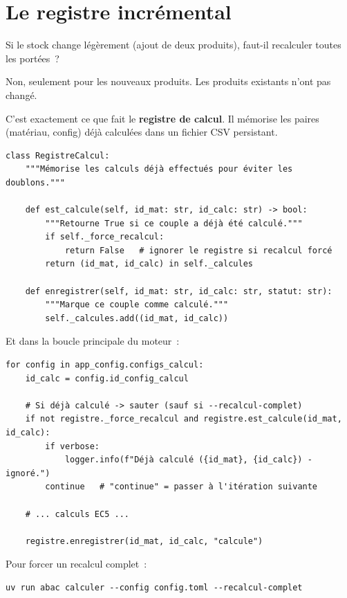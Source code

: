 \section{Le registre incr\'emental}

\begin{maitre}
Si le stock change l\'eg\`erement (ajout de deux produits),
faut-il recalculer toutes les port\'ees~?
\end{maitre}

\begin{apprenti}
Non, seulement pour les nouveaux produits.
Les produits existants n'ont pas chang\'e.
\end{apprenti}

\begin{maitre}
C'est exactement ce que fait le \textbf{registre de calcul}.
Il m\'emorise les paires (mat\'eriau, config) d\'ej\`a calcul\'ees
dans un fichier CSV persistant.
\end{maitre}

\begin{lstlisting}[style=python, caption={Registre incrémental --- extrait de \fichier{registre.py}}]
class RegistreCalcul:
    """Mémorise les calculs déjà effectués pour éviter les doublons."""

    def est_calcule(self, id_mat: str, id_calc: str) -> bool:
        """Retourne True si ce couple a déjà été calculé."""
        if self._force_recalcul:
            return False   # ignorer le registre si recalcul forcé
        return (id_mat, id_calc) in self._calcules

    def enregistrer(self, id_mat: str, id_calc: str, statut: str):
        """Marque ce couple comme calculé."""
        self._calcules.add((id_mat, id_calc))
\end{lstlisting}

Et dans la boucle principale du moteur~:

\begin{lstlisting}[style=python, caption={Usage du registre dans \fichier{moteur.py}}]
for config in app_config.configs_calcul:
    id_calc = config.id_config_calcul

    # Si déjà calculé -> sauter (sauf si --recalcul-complet)
    if not registre._force_recalcul and registre.est_calcule(id_mat, id_calc):
        if verbose:
            logger.info(f"Déjà calculé ({id_mat}, {id_calc}) - ignoré.")
        continue   # "continue" = passer à l'itération suivante

    # ... calculs EC5 ...

    registre.enregistrer(id_mat, id_calc, "calcule")
\end{lstlisting}

Pour forcer un recalcul complet~:

\begin{lstlisting}[style=toml, language={}, caption={Forcer le recalcul complet}]
uv run abac calculer --config config.toml --recalcul-complet
\end{lstlisting}
